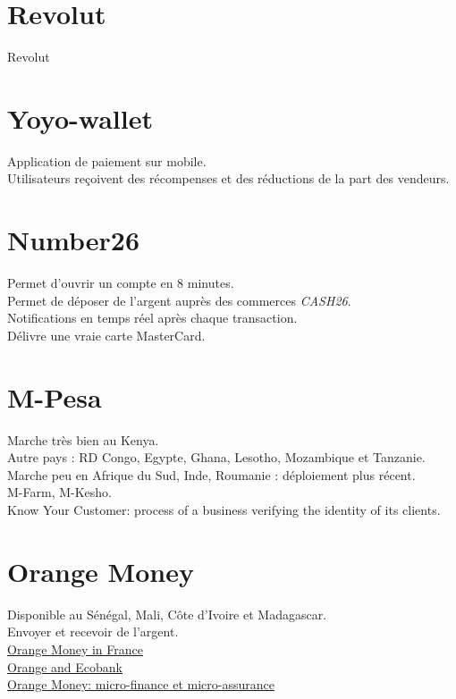 \documentclass{report}
\begin{document}
\section{Revolut}
Revolut
\section{Yoyo-wallet}
Application de paiement sur mobile. \\
Utilisateurs reçoivent des récompenses et des réductions de la part des vendeurs.
\section{Number26}
Permet d'ouvrir un compte en 8 minutes. \\
Permet de déposer de l'argent auprès des commerces \emph{CASH26}. \\
Notifications en temps réel après chaque transaction. \\
Délivre une vraie carte MasterCard.
\section{M-Pesa}
Marche très bien au Kenya. \\
Autre pays : RD Congo, Egypte, Ghana, Lesotho, Mozambique et Tanzanie. \\
Marche peu en Afrique du Sud, Inde, Roumanie : déploiement plus récent. \\
M-Farm, M-Kesho. \\
Know Your Customer:  process of a business verifying the identity of its clients.
\section{Orange Money}
Disponible au Sénégal, Mali, Côte d'Ivoire et Madagascar. \\
Envoyer et recevoir de l'argent. \\
\href{http://www.orange.com/en/Press-and-medias/press-releases-2016/Orange-launches-Orange-Money-in-France-to-allow-money-transfers-to-three-countries-in-Africa-and-within-mainland-France}{Orange Money in France} \\
\href{http://www.orange.com/en/Press-and-medias/press-releases-2016/Orange-and-Ecobank-launch-a-bank-to-wallet-money-transfer-service-linked-to-Orange-Money-in-Cote-d-Ivoire-Guinea-Conakry-and-Niger}{Orange and Ecobank} \\
\href{http://www.jeuneafrique.com/355624/economie/orange-money-vise-de-nouveaux-partenariats-microfinance-microassurance/}{Orange Money: micro-finance et micro-assurance}
\end{document}
